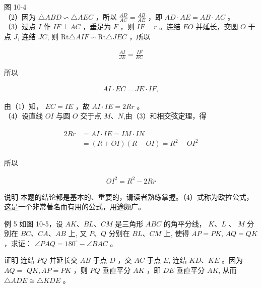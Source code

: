 \documentclass[10pt]{article}
\begin{document}
图 10-4\\
（2）因为 $\triangle A B D \backsim \triangle A E C$ ，所以 $\frac{A D}{A C}=\frac{A B}{A E}$ ，即 $A D \cdot A E=A B \cdot A C$ 。\\
（3）过点 $I$ 作 $I F \perp A C$ ，垂足为 $F$ ，则 $I F=r$ 。连结 $E O$ 并延长，交圆 $O$ 于点 $J$, 连结 $J C$, 则 $\mathrm{Rt} \triangle A I F \backsim \mathrm{Rt} \triangle J E C$ ，所以

\begin{align*}
\frac{A I}{J E}=\frac{I F}{E C}
\end{align*}

所以

\begin{align*}
A I \cdot E C=J E \cdot I F,
\end{align*}

由（1）知， $E C=I E$ ，故 $A I \cdot I E=2 R r$ 。\\
（4）设直线 $O I$ 与圆 $O$ 交于点 $M 、 N$,由（3）和相交弦定理，得

\begin{align*}
\begin{aligned}
2 R r & =A I \cdot I E=I M \cdot I N \\
& =(R+O I)(R-O I)=R^{2}-O I^{2}
\end{aligned}
\end{align*}

所以

\begin{align*}
O I^{2}=R^{2}-2 R r
\end{align*}

说明 本题的结论都是基本的、重要的，请读者熟练掌握。（4）式称为欧拉公式，这是一个非常著名而有用的公式，用途颇广。

例 5 如图 10-5，设 $A K 、 B L 、 C M$ 是三角形 $A B C$ 的角平分线， $K 、 L$ 、 $M$ 分别在 $B C 、 C A 、 A B$ 上, 又 $P 、 Q$ 分别在 $B L 、 C M$ 上, 使得 $A P=P K$, $A Q=Q K$ ，求证： $\angle P A Q=180^{\circ}-\angle B A C$ 。

证明 连结 $P Q$ 并延长交 $A B$ 于点 $D$ ，交 $A C$ 于点 $E$, 连结 $K D 、 K E$ 。因为 $A Q=$ $Q K, A P=P K$ ，则 $P Q$ 垂直平分 $A K$ ，即 $D E$ 垂直平分 $A K$, 从而 $\triangle A D E \cong \triangle K D E$ 。
\end{document}
